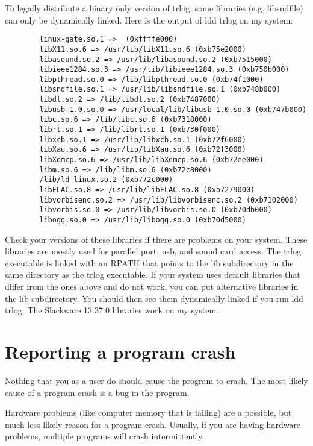\documentclass[12pt]{article}
\begin{document}
To legally distribute a binary only version of trlog, some libraries
(e.g. libsndfile) can only be dynamically linked. Here is the output
of ldd trlog on my system:
\begin{verbatim}
        linux-gate.so.1 =>  (0xffffe000)
        libX11.so.6 => /usr/lib/libX11.so.6 (0xb75e2000)
        libasound.so.2 => /usr/lib/libasound.so.2 (0xb7515000)
        libieee1284.so.3 => /usr/lib/libieee1284.so.3 (0xb750b000)
        libpthread.so.0 => /lib/libpthread.so.0 (0xb74f1000)
        libsndfile.so.1 => /usr/lib/libsndfile.so.1 (0xb748b000)
        libdl.so.2 => /lib/libdl.so.2 (0xb7487000)
        libusb-1.0.so.0 => /usr/local/lib/libusb-1.0.so.0 (0xb747b000)
        libc.so.6 => /lib/libc.so.6 (0xb7318000)
        librt.so.1 => /lib/librt.so.1 (0xb730f000)
        libxcb.so.1 => /usr/lib/libxcb.so.1 (0xb72f6000)
        libXau.so.6 => /usr/lib/libXau.so.6 (0xb72f3000)
        libXdmcp.so.6 => /usr/lib/libXdmcp.so.6 (0xb72ee000)
        libm.so.6 => /lib/libm.so.6 (0xb72c8000)
        /lib/ld-linux.so.2 (0xb772c000)
        libFLAC.so.8 => /usr/lib/libFLAC.so.8 (0xb7279000)
        libvorbisenc.so.2 => /usr/lib/libvorbisenc.so.2 (0xb7102000)
        libvorbis.so.0 => /usr/lib/libvorbis.so.0 (0xb70db000)
        libogg.so.0 => /usr/lib/libogg.so.0 (0xb70d5000)
\end{verbatim}
Check your versions of these libraries if there are problems on your
system. These libraries are mostly
used for parallel port, usb, and sound card access.
The trlog executable is linked with an RPATH that points
to the lib subdirectory in the same directory as the trlog executable.
If your system uses default libraries that differ from the ones
above and do not work, you can put alternative libraries in the lib
subdirectory. You should then see them dynamically linked
if you run ldd trlog. The Slackware 13.37.0 libraries work on my
system.


\section{Reporting a program crash}
Nothing that you as a user do should cause the program to crash.
The most likely cause of a program crash is a bug in the program.

Hardware problems (like computer memory that is failing) are a possible,
but much
less likely reason for a program crash.
Usually, if you are having hardware problems,
multiple programs will crash intermittently.
\end{document}
